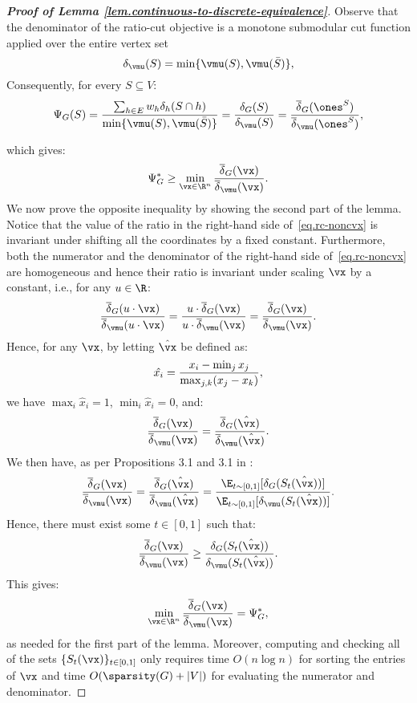 \documentclass[letterpaper]{article}
\begin{document}
\subsection{}
\label{sec.appendix.omitted.results}
\lemcontinuous*
\begin{proof}[{\bf Proof of Lemma \ref{lem.continuous-to-discrete-equivalence}}]
Observe that the denominator of the ratio-cut objective is a monotone submodular cut function applied over the entire vertex set
\begin{equation*}
\delta_{\vmu}(S) = \min \{ \vmu(S), \vmu(\bar{S}) \},
\end{equation*}
Consequently, for every $S \subseteq V$:
\begin{equation*}
\Psi_{G}(S)
=  \frac{\sum_{h\in E}w_h\delta_h(S\cap h)}{\min \{ \vmu(S), \vmu(\bar{S}) \}}
= \frac{\delta_G(S)}{\delta_{\vmu}(S)} = { \overline{\delta}_G(\ones^S)\over \overline{\delta}_{\vmu}(\ones^S)},
\end{equation*}

\noindent
which gives:
\[
    \Psi_G^* \geq \min_{\vx \in \R^n} {\overline{\delta}_G(\vx)\over  \overline{\delta}_{\vmu}(\vx)}.
\]
We now prove the opposite inequality by showing the second part of the lemma. Notice that the value of the ratio in the right-hand side of~\eqref{eq.rc-noncvx} is invariant under shifting all the coordinates by a fixed constant.
Furthermore, both the numerator and the denominator of the right-hand side of~\eqref{eq.rc-noncvx} are homogeneous and hence their ratio is invariant under scaling $\vx$ by a constant, i.e., for any $u \in \R$:
\begin{equation*}
{\overline{\delta}_G(u\cdot \vx) \over \overline{\delta}_{\vmu}(u \cdot \vx)} ={u \cdot \overline{\delta}_G(\vx) \over u \cdot \overline{\delta}_{\vmu}(\vx)} = {\overline{\delta}_G(\vx) \over \overline{\delta}_{\vmu}(\vx)}.
\end{equation*}
Hence, for any $\vx$, by letting $\hat{\vx}$ be defined as:
\[
    \hat{x_i} = {x_i - \min_j x_j \over \max_{j,k}(x_j - x_k)},
\]
\noindent
we have  $\max_i \hat{x}_i = 1$, $\min_i \hat{x}_i = 0$, and:
\[
   {\overline{\delta}_G(\vx) \over \overline{\delta}_{\vmu}(\vx)} = {\overline{\delta}_G(\hat{\vx}) \over \overline{\delta}_{\vmu}(\hat{\vx})}.
\]
We then have, as per Propositions 3.1 and 3.1 in \cite{bach2013learning}:
\[
    {\overline{\delta}_G(\vx) \over \overline{\delta}_{\vmu}(\vx)}= {\overline{\delta}_G(\hat{\vx}) \over \overline{\delta}_{\vmu}(\hat{\vx})} = {\E_{t\sim [0,1]} [\delta_G(S_t(\hat{\vx}))]\over \E_{t\sim [0,1]} [\delta_{\vmu}(S_t(\hat{\vx}))]}.
\]
Hence, there must exist some $t \in [0,1]$ such that:
\[
    {\overline{\delta}_G(\vx) \over \overline{\delta}_{\vmu}(\vx)} \geq { \delta_G(S_t(\hat{\vx}))\over  \delta_{\vmu}(S_t(\hat{\vx}))}.
\]
This gives:
\[
    \min_{\vx \in \R^n} {\overline{\delta}_G(\vx) \over \overline{\delta}_{\vmu}(\vx)} = \Psi_G^*,
\]
as needed for the first part of the lemma. Moreover, computing and checking all of the sets $\{S_t(\vx)\}_{t\in [0,1]}$ only requires time $O(n \log n)$ for sorting the entries of $\vx$ and time $O(\sparsity(G) + |V|)$ for evaluating the numerator and denominator.
\end{proof}
 
\end{document}
